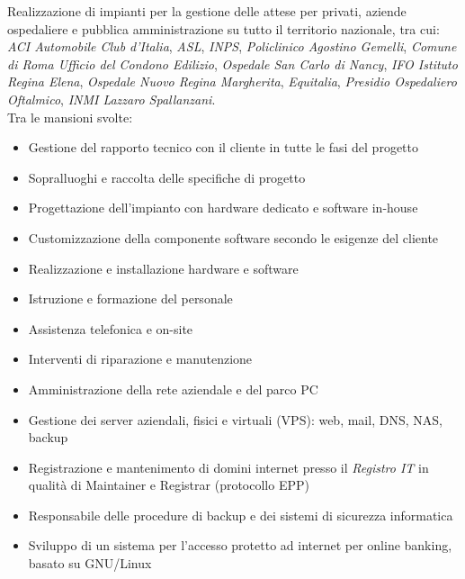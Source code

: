 \documentclass[a4paper, 11pt]{moderncv}
\begin{document}
\vspace{3mm}
        {Realizzazione di impianti per la gestione delle attese per privati, aziende ospedaliere e pubblica 
          amministrazione su tutto il territorio nazionale, tra cui: \emph{ACI Automobile Club d'Italia}, \emph{ASL}, \emph{INPS}, \emph{Policlinico Agostino Gemelli}, \emph{Comune di Roma Ufficio del Condono Edilizio}, \emph{Ospedale San Carlo di Nancy}, \emph{IFO Istituto Regina Elena}, \emph{Ospedale Nuovo Regina Margherita}, \emph{Equitalia}, \emph{Presidio Ospedaliero Oftalmico}, \emph{INMI Lazzaro Spallanzani}.\\Tra le mansioni svolte:
          \begin{itemize}
          \item Gestione del rapporto tecnico con il cliente in tutte le fasi del progetto
          \item Sopralluoghi e raccolta delle specifiche di progetto
          \item Progettazione dell'impianto con hardware dedicato e software in-house
          \item Customizzazione della componente software secondo le esigenze del cliente
          \item Realizzazione e installazione hardware e software
          \item Istruzione e formazione del personale
          \item Assistenza telefonica e on-site
          \item Interventi di riparazione e manutenzione
          \end{itemize}}
\vspace{3mm}
        {\begin{itemize}
          \item Amministrazione della rete aziendale e del parco PC
          \item Gestione dei server aziendali, fisici e virtuali (VPS): web, mail, DNS, NAS, backup
          \item Registrazione e mantenimento di domini internet presso il \emph{Registro IT} in qualità di Maintainer e Registrar (protocollo EPP)
          \item Responsabile delle procedure di backup e dei sistemi di sicurezza informatica
          \item Sviluppo di un sistema per l'accesso protetto ad internet per online banking, basato su GNU/Linux
        \end{itemize}}
\end{document}
